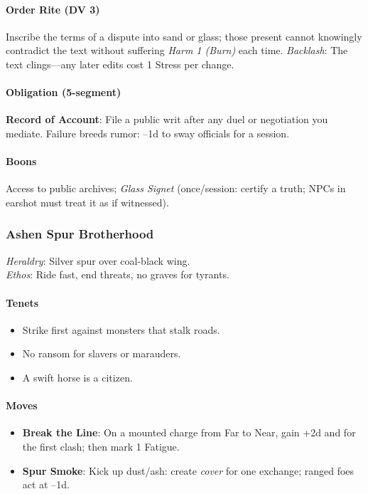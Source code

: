 \documentclass[11pt,letterpaper]{article}
\begin{document}
\paragraph{Order Rite (DV 3)}  
Inscribe the terms of a dispute into sand or glass; those present cannot knowingly contradict the text without suffering \textit{Harm 1 (Burn)} each time. \textit{Backlash}: The text clings---any later edits cost 1 Stress per change.

\paragraph{Obligation (5-segment)}
\textbf{Record of Account}: File a public writ after any duel or negotiation you mediate. Failure breeds rumor: --1d to sway officials for a session.

\paragraph{Boons}
Access to public archives; \textit{Glass Signet} (once/session: certify a truth; NPCs in earshot must treat it as if witnessed).

\bigskip

\subsubsection{Ashen Spur Brotherhood}
\textit{Heraldry}: Silver spur over coal-black wing.\\
\textit{Ethos}: Ride fast, end threats, no graves for tyrants.

\paragraph{Tenets}
\begin{itemize}[leftmargin=*]
\item Strike first against monsters that stalk roads.
\item No ransom for slavers or marauders.
\item A swift horse is a citizen.
\end{itemize}

\paragraph{Moves}
\begin{itemize}[leftmargin=*]
\item \textbf{Break the Line}: On a mounted charge from Far to Near, gain +2d and  for the first clash; then mark 1 Fatigue.
\item \textbf{Spur Smoke}: Kick up dust/ash: create \textit{cover} for one exchange; ranged foes act at --1d.
\end{itemize}
\end{document}
